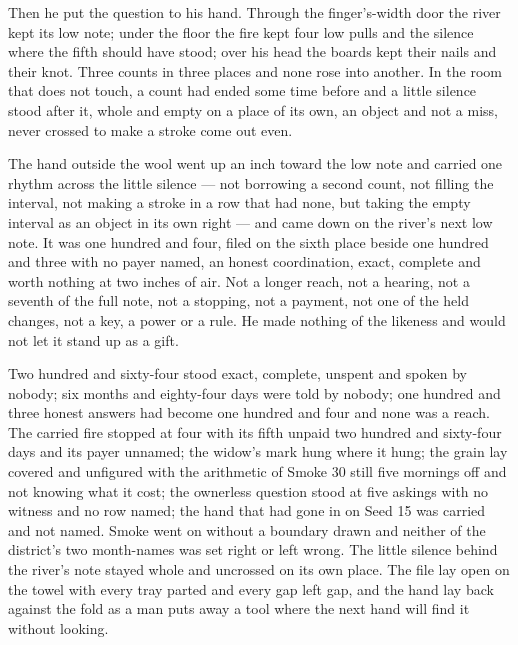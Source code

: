 Then he put the question to his hand. Through the finger's-width door the river kept its low note; under the floor the fire kept four low pulls and the silence where the fifth should have stood; over his head the boards kept their nails and their knot. Three counts in three places and none rose into another. In the room that does not touch, a count had ended some time before and a little silence stood after it, whole and empty on a place of its own, an object and not a miss, never crossed to make a stroke come out even.

The hand outside the wool went up an inch toward the low note and carried one rhythm across the little silence --- not borrowing a second count, not filling the interval, not making a stroke in a row that had none, but taking the empty interval as an object in its own right --- and came down on the river's next low note. It was one hundred and four, filed on the sixth place beside one hundred and three with no payer named, an honest coordination, exact, complete and worth nothing at two inches of air. Not a longer reach, not a hearing, not a seventh of the full note, not a stopping, not a payment, not one of the held changes, not a key, a power or a rule. He made nothing of the likeness and would not let it stand up as a gift.

Two hundred and sixty-four stood exact, complete, unspent and spoken by nobody; six months and eighty-four days were told by nobody; one hundred and three honest answers had become one hundred and four and none was a reach. The carried fire stopped at four with its fifth unpaid two hundred and sixty-four days and its payer unnamed; the widow's mark hung where it hung; the grain lay covered and unfigured with the arithmetic of Smoke 30 still five mornings off and not knowing what it cost; the ownerless question stood at five askings with no witness and no row named; the hand that had gone in on Seed 15 was carried and not named. Smoke went on without a boundary drawn and neither of the district's two month-names was set right or left wrong. The little silence behind the river's note stayed whole and uncrossed on its own place. The file lay open on the towel with every tray parted and every gap left gap, and the hand lay back against the fold as a man puts away a tool where the next hand will find it without looking.
